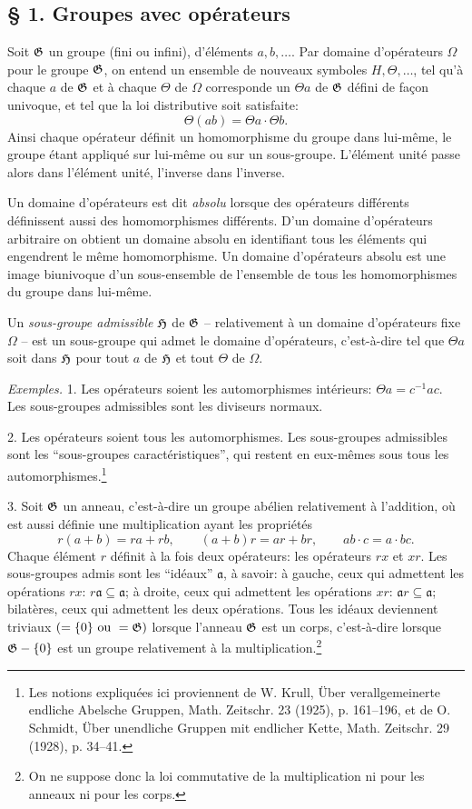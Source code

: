 \subsection*{\S{} 1. Groupes avec opérateurs}

Soit $\mathfrak{G}$ un groupe (fini ou infini), d'éléments $a,b,\ldots$. Par domaine d'opérateurs $\Omega$ pour le groupe $\mathfrak{G}$, on entend un ensemble de nouveaux symboles $H,\Theta,\ldots$, tel qu'à chaque $a$ de $\mathfrak{G}$ et à chaque $\Theta$ de $\Omega$ corresponde un $\Theta a$ de $\mathfrak{G}$ défini de façon univoque, et tel que la loi distributive soit satisfaite:
\[
        \Theta(ab)=\Theta a\cdot\Theta b.
\]
Ainsi chaque opérateur définit un homomorphisme du groupe dans lui-même, le groupe étant appliqué sur lui-même ou sur un sous-groupe. L'élément unité passe alors dans l'élément unité, l'inverse dans l'inverse.

Un domaine d'opérateurs est dit \emph{absolu} lorsque des opérateurs différents définissent aussi des homomorphismes différents. D'un domaine d'opérateurs arbitraire on obtient un domaine absolu en identifiant tous les éléments qui engendrent le même homomorphisme. Un domaine d'opérateurs absolu est une image biunivoque d'un sous-ensemble de l'ensemble de tous les homomorphismes du groupe dans lui-même.

Un \emph{sous-groupe admissible} $\mathfrak{H}$ de $\mathfrak{G}$ -- relativement à un domaine d'opérateurs fixe $\Omega$ -- est un sous-groupe qui admet le domaine d'opérateurs, c'est-à-dire tel que $\Theta a$ soit dans $\mathfrak{H}$ pour tout $a$ de $\mathfrak{H}$ et tout $\Theta$ de $\Omega$.

\emph{Exemples.} 1. Les opérateurs soient les automorphismes intérieurs: $\Theta a=c^{-1}ac$. Les sous-groupes admissibles sont les diviseurs normaux.

2. Les opérateurs soient tous les automorphismes. Les sous-groupes admissibles sont les ``sous-groupes caractéristiques'', qui restent en eux-mêmes sous tous les automorphismes.\footnote{Les notions expliquées ici proviennent de W. Krull, Über verallgemeinerte endliche Abelsche Gruppen, Math. Zeitschr. 23 (1925), p. 161--196, et de O. Schmidt, Über unendliche Gruppen mit endlicher Kette, Math. Zeitschr. 29 (1928), p. 34--41.}

3. Soit $\mathfrak{G}$ un anneau, c'est-à-dire un groupe abélien relativement à l'addition, où est aussi définie une multiplication ayant les propriétés
\[
        r(a+b)=ra+rb,\qquad (a+b)r=ar+br,\qquad ab\cdot c=a\cdot bc.
\]
Chaque élément $r$ définit à la fois deux opérateurs: les opérateurs $rx$ et $xr$. Les sous-groupes admis sont les ``idéaux'' $\mathfrak a$, à savoir: à gauche, ceux qui admettent les opérations $rx$: $r\mathfrak a\subseteq\mathfrak a$; à droite, ceux qui admettent les opérations $xr$: $\mathfrak a r\subseteq\mathfrak a$; bilatères, ceux qui admettent les deux opérations. Tous les idéaux deviennent triviaux $(=\{0\}\text{ ou }=\mathfrak{G})$ lorsque l'anneau $\mathfrak{G}$ est un corps, c'est-à-dire lorsque $\mathfrak{G}-\{0\}$ est un groupe relativement à la multiplication.\footnote{On ne suppose donc la loi commutative de la multiplication ni pour les anneaux ni pour les corps.}

